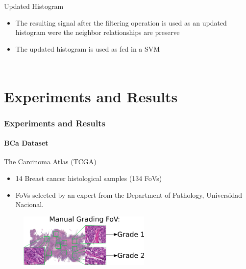 \documentclass[usenames,dvipsnames]{beamer}
\begin{document}
\begin{frame}{Updated Histogram}
\begin{itemize}
\item<1->The resulting signal after the filtering operation is used as an updated histogram were the neighbor relationships are preserve
\item<2-> The updated histogram is used as fed in a SVM
\end{itemize}
\begin{columns}          
\begin{column}{5cm}    
	\begin{figure}
		
	\end{figure}
\end{column}           
    \end{columns}
\end{frame}

\section{Experiments and Results}

\begin{frame}

\frametitle{Experiments and Results}
\framesubtitle{BCa Dataset}
\centering
\footnotesize \begin{block}{The Carcinoma Atlas (TCGA)}
\begin{itemize}
\item 14 Breast cancer histological samples (134 FoVs)
\item FoVs selected by an expert from the Department of Pathology, Universidad Nacional.
\end{itemize}
\end{block}
\begin{figure}
\includegraphics[width=6.5cm]{imagenes/fov.png}
\end{figure}
\end{frame}
\end{document}
